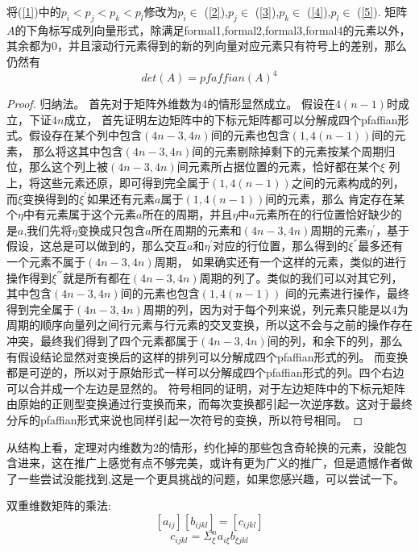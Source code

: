 \documentclass{amsc}          %
\numberwithin{equation}{section} %
\begin{document}
\begin{theorem}
将(\ref{1})中的$p_{i}<p_{j}<p_{k}<p_{l}$修改为$p_{i}\in$ (\ref{2}),$p_{j}\in$ (\ref{3}),$p_{k}\in$ (\ref{4}),$p_{l}\in$ (\ref{5}).
矩阵$A$的下角标写成列向量形式，除满足formal1,formal2,formal3,formal4的元素以外，其余都为0，并且滚动行元素得到的新的列向量对应元素只有符号上的差别，那么仍然有$$det(A)=pfaffian(A)^{4}$$
\end{theorem}
\begin{proof}
归纳法。
首先对于矩阵外维数为4的情形显然成立。
假设在$4(n-1)$时成立，下证$4n$成立，
首先证明左边矩阵中的下标元矩阵都可以分解成四个pfaffian形式。假设存在某个列中包含$(4n-3,4n)$间的元素也包含$(1,4(n-1))$间的元素，
那么将这其中包含$(4n-3,4n)$间的元素剔除掉剩下的元素按某个周期归位，那么这个列上被$(4n-3,4n)$间元素所占据位置的元素，恰好都在某个$\xi$
列上，将这些元素还原，即可得到完全属于$(1,4(n-1))$之间的元素构成的列，而$\xi$变换得到的$\xi^{'}$如果还有元素$a$属于$(1,4(n-1))$间的元素，那么
肯定存在某个$\eta$中有元素属于这个元素$a$所在的周期，并且$\eta$中$a$元素所在的行位置恰好缺少的是$a$,我们先将$\eta$变换成只包含$a$所在周期的元素和$(4n-3,4n)$周期的元素$\eta^{'}$，基于假设，这总是可以做到的，那么交互$a$和$\eta^{'}$对应的行位置，那么得到的$\xi^{''}$最多还有一个元素不属于$(4n-3,4n)$周期，
如果确实还有一个这样的元素，类似的进行操作得到$\xi^{'''}$就是所有都在$(4n-3,4n)$周期的列了。类似的我们可以对其它列，其中包含$(4n-3,4n)$间的元素也包含$(1,4(n-1))$ 间的元素进行操作，最终得到完全属于$(4n-3,4n)$周期的列，因为对于每个列来说，列元素只能是以4为周期的顺序向量列之间行元素与行元素的交叉变换，所以这不会与之前的操作存在冲突，最终我们得到了四个元素都属于$(4n-3,4n)$间的列，和余下的列，那么有假设结论显然对变换后的这样的排列可以分解成四个pfaffian形式的列。
而变换都是可逆的，所以对于原始形式一样可以分解成四个pfaffian形式的列。四个右边可以合并成一个左边是显然的。
符号相同的证明，对于左边矩阵中的下标元矩阵由原始的正则型变换通过行变换而来，而每次变换都引起一次逆序数。这对于最终分斥的pfaffian形式来说也同样引起一次符号的变换，所以符号相同。
\end{proof}
从结构上看，定理对内维数为2的情形，约化掉的那些包含奇轮换的元素，没能包含进来，这在推广上感觉有点不够完美，或许有更为广义的推广，但是遗憾作者做了一些尝试没能找到,这是一个更具挑战的问题，如果您感兴趣，可以尝试一下。


\begin{definition}  双重维数矩阵的乘法:
   $$[a_{ij}][b_{ijkl}]=[c_{ijkl}]$$
   $$c_{ijkl} = \Sigma_{\xi}^{n}a_{i\xi}b_{\xi jkl}$$
\end{definition}
\end{document}
